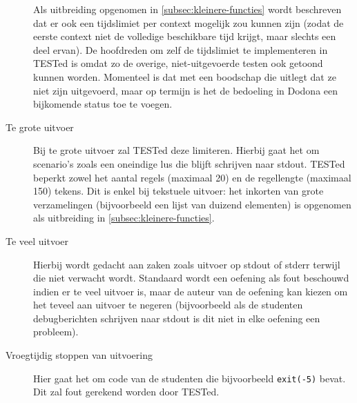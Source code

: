 \begin{description}
    Als uitbreiding opgenomen in \cref{subsec:kleinere-functies} wordt beschreven dat er ook een tijdslimiet per context mogelijk zou kunnen zijn (zodat de eerste context niet de volledige beschikbare tijd krijgt, maar slechts een deel ervan).
    De hoofdreden om zelf de tijdslimiet te implementeren in TESTed is omdat zo de overige, niet-uitgevoerde testen ook getoond kunnen worden.
    Momenteel is dat met een boodschap die uitlegt dat ze niet zijn uitgevoerd, maar op termijn is het de bedoeling in Dodona een bijkomende status toe te voegen.
    \item[Te grote uitvoer] Bij te grote uitvoer zal TESTed deze limiteren.
    Hierbij gaat het om scenario's zoals een oneindige lus die blijft schrijven naar stdout.
    TESTed beperkt zowel het aantal regels (maximaal 20) en de regellengte (maximaal 150) tekens.
    Dit is enkel bij tekstuele uitvoer: het inkorten van grote verzamelingen (bijvoorbeeld een lijst van duizend elementen) is opgenomen als uitbreiding in \cref{subsec:kleinere-functies}.
    \item[Te veel uitvoer] Hierbij wordt gedacht aan zaken zoals uitvoer op stdout of stderr terwijl die niet verwacht wordt.
    Standaard wordt een oefening als fout beschouwd indien er te veel uitvoer is, maar de auteur van de oefening kan kiezen om het teveel aan uitvoer te negeren (bijvoorbeeld als de studenten debugberichten schrijven naar stdout is dit niet in elke oefening een probleem).
    \item[Vroegtijdig stoppen van uitvoering] Hier gaat het om code van de studenten die bijvoorbeeld \texttt{exit(-5)} bevat.
    Dit zal fout gerekend worden door TESTed.

\end{description}
